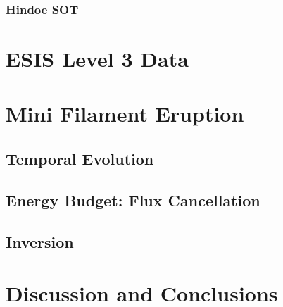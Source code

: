 \subsubsection{Hindoe SOT}

\section{ESIS Level 3 Data}


\section{Mini Filament Eruption}
\subsection{Temporal Evolution}
\subsection{Energy Budget: Flux Cancellation}
\subsection{Inversion}



\section{Discussion and Conclusions}